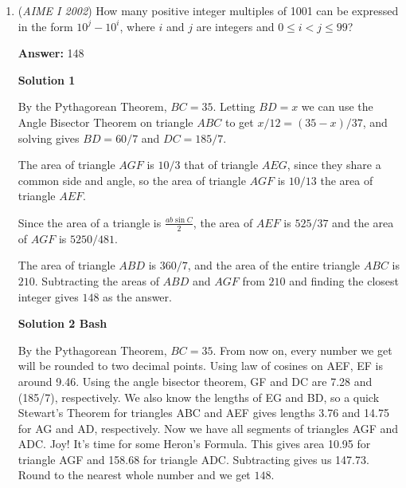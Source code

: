 \begin{enumerate}
 Since the 4th picket must henceforth be reached via t = 2, we either have the 5th picket reached via u = 2 (requiring h to be any number exceeding the number of pickets, and we're stipulating that this is not allowed), or we have the 5th picket reached via h = 4, from which it follows that u = 4. So we have accumulated the solutions 333 and 424 and we have exhausted both the space of reasonable possibilities as well as the available space before we would exceed 999.

 


	\item (\textit{AIME I 2002}) How many positive integer multiples of 1001 can be expressed in the form $10^{j} - 10^{i}$, where $i$ and $j$ are integers and $0\leq i < j \leq 99$?


 
 \textbf{Answer: }148



\textbf{Solution 1}

By the Pythagorean Theorem, $BC=35$. Letting $BD=x$ we can use the Angle Bisector Theorem on triangle $ABC$ to get $x/12=(35-x)/37$, and solving gives $BD=60/7$ and $DC=185/7$.

 The area of triangle $AGF$ is $10/3$ that of triangle $AEG$, since they share a common side and angle, so the area of triangle $AGF$ is $10/13$ the area of triangle $AEF$.

 Since the area of a triangle is $\frac{ab\sin{C}}2$, the area of $AEF$ is $525/37$ and the area of $AGF$ is $5250/481$.

 The area of triangle $ABD$ is $360/7$, and the area of the entire triangle $ABC$ is $210$. Subtracting the areas of $ABD$ and $AGF$ from $210$ and finding the closest integer gives $\boxed{148}$ as the answer.

 


 



\textbf{Solution 2 Bash}

By the Pythagorean Theorem, $BC=35$. From now on, every number we get will be rounded to two decimal points. Using law of cosines on AEF, EF is around 9.46. Using the angle bisector theorem, GF and DC are 7.28 and (185/7), respectively. We also know the lengths of EG and BD, so a quick Stewart's Theorem for triangles ABC and AEF gives lengths 3.76 and 14.75 for AG and AD, respectively. Now we have all segments of triangles AGF and ADC. Joy! It's time for some Heron's Formula. This gives area 10.95 for triangle AGF and 158.68 for triangle ADC. Subtracting gives us 147.73. Round to the nearest whole number and we get $\boxed{148}$.


\end{enumerate}
